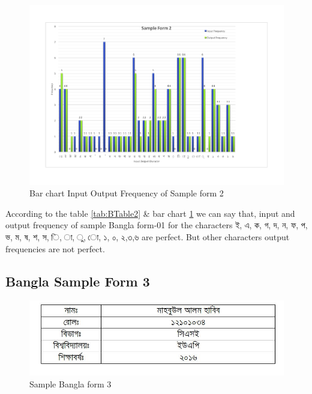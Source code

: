 \begin{figure}[H]
\centering
\includegraphics[width=1\textwidth]{Bform2.pdf}
\caption {Bar chart Input Output Frequency of Sample form 2}
\label {fig:Bbar2}
\end{figure}

According to the table \ref{tab:BTable2} \& bar chart \ref{fig:Bbar2} we can say that, input and output frequency of sample Bangla form-01 for the characters {\bengalifont ই, এ, ক, গ, দ, ন, ফ, প, ভ, ম, ষ, শ, স, ি, া, ু, ো, ১, ০, ২,৩,৬ }are perfect. But other characters output frequencies are not perfect.

\subsection{Bangla Sample Form 3}
\begin{figure}[H]
\centering
\includegraphics[width=1\textwidth]{formBen03.JPG}
\caption {Sample Bangla form 3}
\label {fig:FormBan3}
\end{figure}


